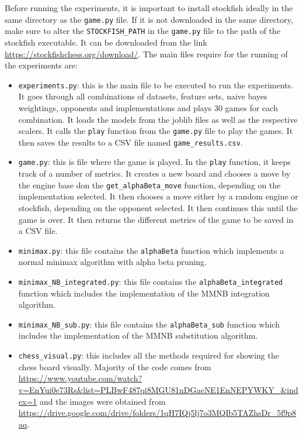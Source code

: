 Before running the experiments, it is important to install stockfish ideally in the same directory as the \texttt{game.py} file. If it is not downloaded in the same directory, make sure to alter the \texttt{STOCKFISH\_PATH} in the \texttt{game.py} file to the path of the stockfish executable. It can be downloaded from the link \url{https://stockfishchess.org/download/}.
The main files require for the running of the experiments are:

\begin{itemize}
    \item \texttt{experiments.py}: this is the main file to be executed to run the experiments. It goes through all combinations of datasets, feature sets, naive bayes weightings, opponents and implementations and plays 30 games for each combination. It loads the models from the joblib files as well as the respective scalers. It calls the \texttt{play} function from the \texttt{game.py} file to play the games. It then saves the results to a CSV file named \texttt{game\_results.csv}.
    \item \texttt{game.py}: this is file where the game is played. In the \texttt{play} function, it keeps track of a number of metrics. It creates a new board and chooses a move by the engine base don the \texttt{get\_alphaBeta\_move} function, depending on the implementation selected. It then chooses a move either by a random engine or stockfish, depending on the opponent selected. It then continues this until the game is over. It then returns the different metrics of the game to be saved in a CSV file. 
    \item \texttt{minimax.py}: this file contains the \texttt{alphaBeta} function which implements a normal minimax algorithm with alpha beta pruning.
    \item \texttt{minimax\_NB\_integrated.py}: this file contains the \texttt{alphaBeta\_integrated} function which includes the implementation of the MMNB integration algorithm.
    \item \texttt{minimax\_NB\_sub.py}: this file contains the \texttt{alphaBeta\_sub} function which includes the implementation of the MMNB substitution algorithm.
    \item \texttt{chess\_visual.py}: this includes all the methods required for showing the chess board visually. Majority of the code comes from \url{https://www.youtube.com/watch?v=EnYui0e73Rs&list=PLBwF487qi8MGU81nDGaeNE1EnNEPYWKY_&index=1} and the images were obtained from \url{https://drive.google.com/drive/folders/1qH7IQj5lj7o3MQIb5TAZhsDr_5f9p8aq}.
\end{itemize}



